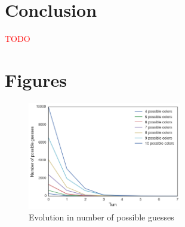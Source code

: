 \documentclass[11pt]{article}
\begin{document}

\section{Conclusion}

\noindent \textcolor{red}{TODO}

%


\newpage
\appendix

\section{Figures}

\begin{figure}[!htbp]
\centering
\includegraphics[width=0.6\textwidth]{img/num_guesses}
\caption{Evolution in number of possible guesses}
\label{fig:num_guesses}
\end{figure}
\end{document}
